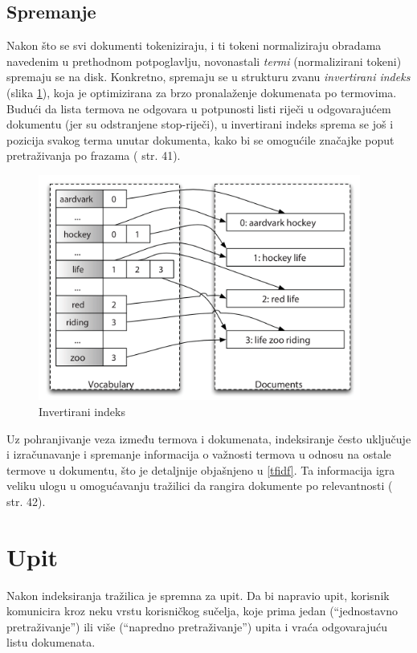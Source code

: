 \documentclass[a4paper,twoside,12pt]{scrreprt}
\begin{document}
\subsection{Spremanje}

Nakon što se svi dokumenti tokeniziraju, i ti tokeni normaliziraju obradama navedenim u prethodnom potpoglavlju, novonastali \textit{termi} (normalizirani tokeni) spremaju se na disk. Konkretno, spremaju se u strukturu zvanu \textit{invertirani indeks} (slika \ref{inverted_index}), koja je optimizirana za brzo pronalaženje dokumenata po termovima. Budući da lista termova ne odgovara u potpunosti listi riječi u odgovarajućem dokumentu (jer su odstranjene stop-riječi), u invertirani indeks sprema se još i pozicija svakog terma unutar dokumenta, kako bi se omogućile značajke poput pretraživanja po frazama (\cite{taming} str. 41).

\newpage

\begin{figure}[H]
  \centering
  \includegraphics[width=300pt]{inverted_index}
  \caption{Invertirani indeks}
  \label{inverted_index}
\end{figure}

Uz pohranjivanje veza između termova i dokumenata, indeksiranje često uključuje i izračunavanje i spremanje informacija o važnosti termova u odnosu na ostale termove u dokumentu, što je detaljnije objašnjeno u \ref{tfidf}. Ta informacija igra veliku ulogu u omogućavanju tražilici da rangira dokumente po relevantnosti (\cite{taming} str. 42).

\section{Upit}

Nakon indeksiranja tražilica je spremna za upit. Da bi napravio upit, korisnik komunicira kroz neku vrstu korisničkog sučelja, koje prima jedan (``jednostavno pretraživanje'') ili više (``napredno pretraživanje'') upita i vraća odgovarajuću listu dokumenata.
\end{document}
